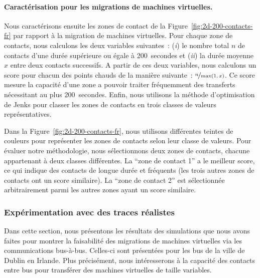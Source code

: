  
\paragraph{Caractérisation pour les migrations de machines virtuelles.} 
Nous caractérisons ensuite les zones de contact de la Figure~\ref{fig:2d-200-contacts-fr} par rapport à la migration de machines virtuelles. Pour chaque zone de contacts, nous calculons les deux variables suivantes~: (\textit{i}) le nombre total $n$ de contacts d’une durée supérieure ou égale à 200~secondes et (\textit{ii}) la durée moyenne $x$ entre deux contacts successifs. A partir de ces deux variables, nous calculons un score pour chacun des points chauds de la manière suivante~: $\nicefrac{n}{\max(1,\,x)}$. Ce score mesure la capacité d’une zone a pouvoir traiter fréquemment des transferts nécessitant au plus 200~secondes. Enfin, nous utilisons la méthode d’optimisation de Jenks pour classer les zones de contacts en trois classes de valeurs représentatives. 
 
 
Dans la Figure~\ref{fig:2d-200-contacts-fr}, nous utilisons différentes teintes de couleurs pour représenter les zones de contacts selon leur classe de valeurs. Pour évaluer notre méthodologie, nous sélectionnons deux zones de contacts, chacune appartenant à deux classes différentes. La ``zone de contact 1'' a le meilleur score, ce qui indique des contacts de longue durée et fréquents (les trois autres zones de contacts ont un score similaire). La ``zone de contact 2'' est sélectionnée arbitrairement parmi les autres zones ayant un score similaire. 
 
 
\subsubsection{Expérimentation avec des traces réalistes} 
 
 
Dans cette section, nous présentons les résultats des simulations que nous avons faites pour montrer la faisabilité des migrations de machines virtuelles via les communications bus-à-bus. Celles-ci sont présentées pour les bus de la ville de Dublin en Irlande. Plus précisément, nous intéresserons à la capacité des contacts entre bus pour transférer des machines virtuelles de taille variables. 
 
 
